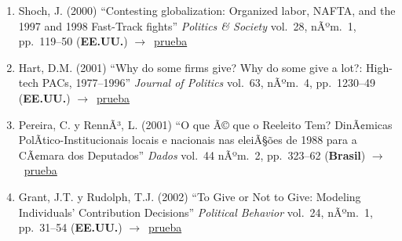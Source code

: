 \documentclass[12 pt, letter]{article}
\newenvironment{CitasMiTrabajo}{
    \begin{footnotesize}
    \begin{enumerate}[label={\footnotesize\emph{cita~\arabic*}},ref=\arabic*] %
        \setlength{\itemsep}{.1\itemsep}
        \setlength{\parskip}{.1\parskip}
    }{\end{enumerate}\end{footnotesize}}
\begin{document}

        \begin{CitasMiTrabajo}

        \item Shoch, J. (2000)
        ``Contesting globalization: Organized labor, NAFTA, and the 1997 and 1998 Fast-Track fights'' \emph{Politics \& Society} vol.\ 28, nÃºm.\ 1, pp.\ 119--50  (\textbf{EE.UU.}) $\rightarrow$~\href{http://ericmagar.com/cv/cites/coxMagar/shoch.pdf}{prueba}

        \item Hart, D.M. (2001)
        ``Why do some firms give? Why do some give a lot?: High-tech PACs, 1977--1996'' \emph{Journal of Politics} vol.\ 63, nÃºm.\ 4, pp.\ 1230--49
        (\textbf{EE.UU.}) $\rightarrow$~\href{http://ericmagar.com/cv/cites/coxMagar/hart.pdf}{prueba}


       \item Pereira, C. y RennÃ³, L. (2001) ``O que Ã© que o Reeleito Tem? DinÃ¢micas PolÃ­tico-Institucionais locais e nacionais nas eleiÃ§{\~oes de 1988 para a CÃ¢mara dos Deputados''} \emph{Dados} vol.\ 44 nÃºm.\ 2, pp.\ 323--62 (\textbf{Brasil}) $\rightarrow$~\href{http://ericmagar.com/cv/cites/coxMagar/PereiraRennoDados2001.pdf}{prueba}

        \item Grant, J.T. y Rudolph, T.J. (2002)
        ``To Give or Not to Give: Modeling Individuals' Contribution Decisions''
        \emph{Political Behavior} vol.\ 24, nÃºm.\ 1, pp.\ 31--54 (\textbf{EE.UU.}) $\rightarrow$~\href{http://ericmagar.com/cv/cites/coxMagar/grant.pdf}{prueba}


\end{CitasMiTrabajo}
\end{document}
